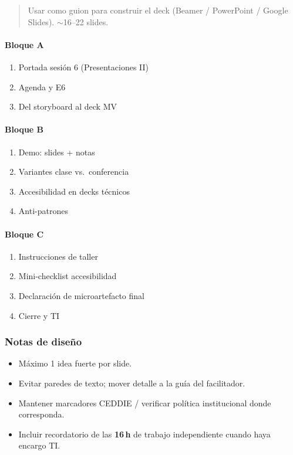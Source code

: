 \begin{quote}
Usar como guion para construir el deck (Beamer / PowerPoint / Google Slides). $\sim$16--22 slides.
\end{quote}

\paragraph{Bloque A}\begin{enumerate}
\item Portada sesión 6 (Presentaciones II)
\item Agenda y E6
\item Del storyboard al deck MV
\end{enumerate}
\paragraph{Bloque B}\begin{enumerate}
\item Demo: slides + notas
\item Variantes clase vs.\ conferencia
\item Accesibilidad en decks técnicos
\item Anti-patrones
\end{enumerate}
\paragraph{Bloque C}\begin{enumerate}
\item Instrucciones de taller
\item Mini-checklist accesibilidad
\item Declaración de microartefacto final
\item Cierre y TI
\end{enumerate}

\subsubsection*{Notas de diseño}
\begin{itemize}
\item Máximo 1 idea fuerte por slide.
\item Evitar paredes de texto; mover detalle a la guía del facilitador.
\item Mantener marcadores CEDDIE / verificar política institucional donde corresponda.
\item Incluir recordatorio de las \textbf{16\,h} de trabajo independiente cuando haya encargo TI.
\end{itemize}
